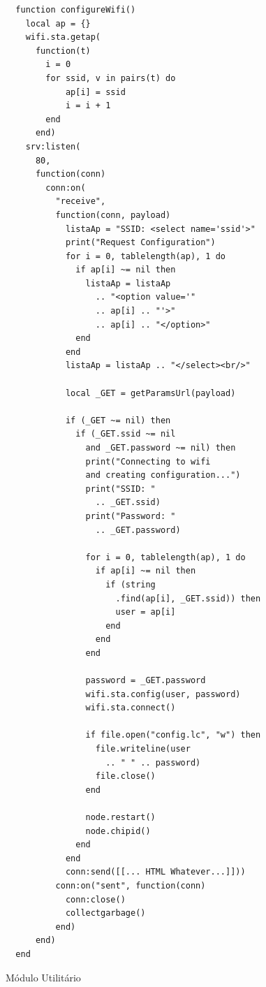 \documentclass[journal]{IEEEtran}
\begin{document}
\begin{figure}[H]
\centering

\begin{lstlisting}
  function configureWifi()
    local ap = {}
    wifi.sta.getap(
      function(t)
        i = 0
        for ssid, v in pairs(t) do
            ap[i] = ssid
            i = i + 1
        end
      end)
    srv:listen(
      80,
      function(conn)
        conn:on(
          "receive",
          function(conn, payload)
            listaAp = "SSID: <select name='ssid'>"
            print("Request Configuration")
            for i = 0, tablelength(ap), 1 do
              if ap[i] ~= nil then
                listaAp = listaAp 
                  .. "<option value='" 
                  .. ap[i] .. "'>" 
                  .. ap[i] .. "</option>"
              end
            end
            listaAp = listaAp .. "</select><br/>"
            
            local _GET = getParamsUrl(payload)
            
            if (_GET ~= nil) then
              if (_GET.ssid ~= nil 
                and _GET.password ~= nil) then
                print("Connecting to wifi 
                and creating configuration...")
                print("SSID: " 
                  .. _GET.ssid)
                print("Password: " 
                  .. _GET.password)
                
                for i = 0, tablelength(ap), 1 do
                  if ap[i] ~= nil then
                    if (string
                      .find(ap[i], _GET.ssid)) then
                      user = ap[i]
                    end
                  end
                end
                
                password = _GET.password
                wifi.sta.config(user, password)
                wifi.sta.connect()
                
                if file.open("config.lc", "w") then
                  file.writeline(user 
                    .. " " .. password)
                  file.close()
                end
                
                node.restart()
                node.chipid()
              end
            end
            conn:send([[... HTML Whatever...]]))
          conn:on("sent", function(conn)
            conn:close()
            collectgarbage()
          end)
      end)
  end
\end{lstlisting}

\caption{Módulo Utilitário}
\label{alg:configcondif}
\end{figure}
\end{document}
